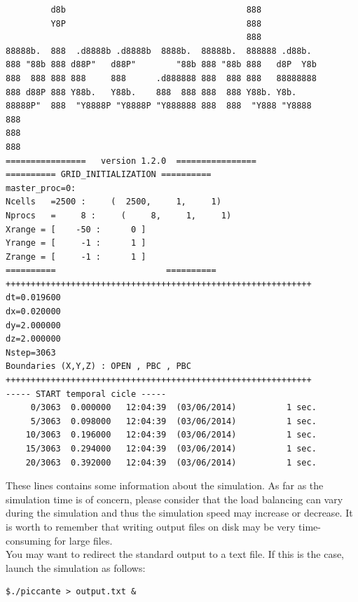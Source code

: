 \documentclass[11pt,a4paper]{report}
\begin{document}
\begin{verbatim}
         d8b                                    888                
         Y8P                                    888                
                                                888                
88888b.  888  .d8888b .d8888b  8888b.  88888b.  888888 .d88b.      
888 "88b 888 d88P"   d88P"        "88b 888 "88b 888   d8P  Y8b
888  888 888 888     888      .d888888 888  888 888   88888888     
888 d88P 888 Y88b.   Y88b.    888  888 888  888 Y88b. Y8b.         
88888P"  888  "Y8888P "Y8888P "Y888888 888  888  "Y888 "Y8888
888                                                                
888                                                                
888                                                                
================   version 1.2.0  ================
========== GRID_INITIALIZATION ==========
master_proc=0:
Ncells   =2500 :     (  2500,     1,     1)
Nprocs   =     8 :     (     8,     1,     1)
Xrange = [    -50 :      0 ]
Yrange = [     -1 :      1 ]
Zrange = [     -1 :      1 ]
==========                      ==========
+++++++++++++++++++++++++++++++++++++++++++++++++++++++++++++
dt=0.019600
dx=0.020000
dy=2.000000
dz=2.000000
Nstep=3063
Boundaries (X,Y,Z) : OPEN , PBC , PBC 
+++++++++++++++++++++++++++++++++++++++++++++++++++++++++++++
----- START temporal cicle -----
     0/3063  0.000000   12:04:39  (03/06/2014)          1 sec.
     5/3063  0.098000   12:04:39  (03/06/2014)          1 sec.
    10/3063  0.196000   12:04:39  (03/06/2014)          1 sec.
    15/3063  0.294000   12:04:39  (03/06/2014)          1 sec.
    20/3063  0.392000   12:04:39  (03/06/2014)          1 sec.
\end{verbatim}
These lines contains some information about the simulation. As far as the simulation time is of concern, please consider that the load balancing can vary during the simulation and thus the simulation speed may increase or decrease. It is worth to remember that writing output files on disk may be very time-consuming for large files.\\
You may want to redirect the standard output to a text file. If this is the case, launch the simulation as follows:
\begin{verbatim}
$./piccante > output.txt &
\end{verbatim}
\end{document}
